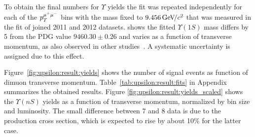 % 


To obtain the final numbers for $\Upsilon$ yields the fit was repeated
independently for each of the $p_T^{{\mu^+\mu^-}}$ bins with the \OneS mass fixed to
$9.456 {\mathrm{\,Ge\kern -0.1em V\!/}c^2}$ that was measured in the fit of joined 2011 and 2012 datasets.
 shows  the fitted $\Upsilon(1S)$
mass differs by 5 \mevcc from the PDG value $9460.30 \pm  0.26$ \mevcc and
varies as a function of transverse momentum, as also observed in other
studies~\cite{Aaij:2013yaa}. A systematic uncertainty is assigned due to this
effect.

Figure~\ref{fig:upsilon:result:yields} shows the number of signal events as
function of dimuon transverse momentum. Table~\ref{tab:upsilon:result:fits} in
Appendix summarizes the obtained results. Figure
\ref{fig:upsilon:result:yields_scaled} shows the $\Upsilon(nS)$ yields as a
function of transverse momentum, normalized by bin size and luminosity. The
small difference between 7 and 8 \tev data is due to the production cross
section, which is expected to rise by about 10\% for the latter case.




